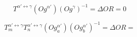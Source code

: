 $$T^{\alpha'\leftrightarrow\gamma}\left(Og^{\alpha'}\right)\left(Og^{\gamma}\right)^{-1} = \Delta OR = 0\label{eq:1}$$

$$T_{m}^{\alpha'\leftrightarrow\gamma}T_{n}^{\alpha'\leftrightarrow\gamma}\left(Og_{a}^{\alpha'}\right)\left(Og_{b}^{\alpha'}\right)^{-1} = \Delta OR = \label{eq:2}$$

